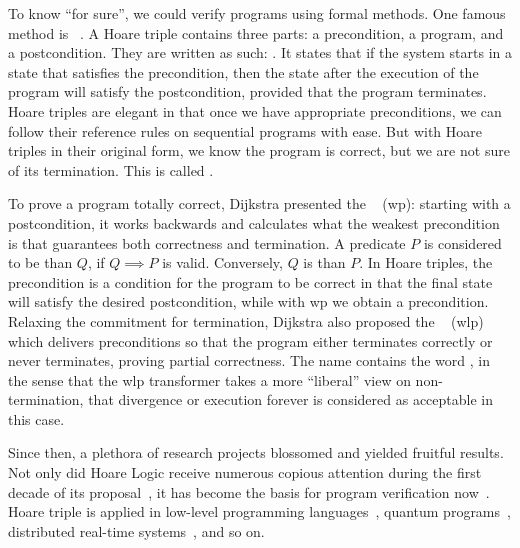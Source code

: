 To know ``for sure'', we could verify programs using formal methods. 
One famous method is ~\cite{hoare69}. 
A Hoare triple contains three parts: a precondition, a program, and a postcondition. 
They are written as such: .
It states that if the system starts in a state that satisfies the precondition, then the state after the execution of the program will satisfy the postcondition, provided that the program terminates.
Hoare triples are elegant in that once we have appropriate preconditions, we can follow their reference rules on sequential programs with ease. 
But with Hoare triples in their original form, we know the program is correct, but we are not sure of its termination. 
This is called . 

To prove a program totally correct, Dijkstra presented the ~\cite{dijkstra75} (wp): starting with a postcondition, it works backwards and calculates what the weakest precondition is that guarantees both correctness and termination. 
A predicate $P$ is considered to be  than $Q$, if $Q\implies P$ is valid. 
Conversely, $Q$ is  than $P$. 
In Hoare triples, the precondition is a  condition for the program to be correct in that the final state will satisfy the desired postcondition, while with wp we obtain a  precondition. 
Relaxing the commitment for termination, Dijkstra also proposed the ~\cite{dijkstra90} (wlp) which delivers preconditions so that the program either terminates correctly or never terminates, proving partial correctness. 
The name contains the word , in the sense that the wlp transformer takes a more ``liberal'' view on non-termination, that divergence or execution forever is considered as acceptable in this case. 

Since then, a plethora of research projects blossomed and yielded fruitful results. 
Not only did Hoare Logic receive numerous copious attention during the first decade of its proposal~\cite{apt81}, it has become the basis for program verification now~\cite{gordon2010ForwardHoare}. 
Hoare triple is applied in low-level programming languages~\cite{myreen07}, quantum programs~\cite{zhou19}, distributed real-time systems~\cite{hooman1994extending}, and so on. 


